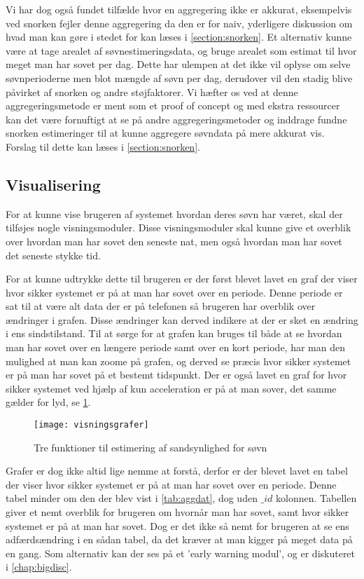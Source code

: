 Vi har dog også fundet tilfælde hvor en aggregering ikke er akkurat, eksempelvis ved snorken fejler denne aggregering da den er for naiv, yderligere diskussion om hvad man kan gøre i stedet for kan læses i \cref{section:snorken}.
Et alternativ kunne være at tage arealet af søvnestimeringsdata, og bruge arealet som estimat til hvor meget man har sovet per dag.
Dette har ulempen at det ikke vil oplyse om selve søvnperioderne men blot mængde af søvn per dag, derudover vil den stadig blive påvirket af snorken og andre støjfaktorer.
Vi hæfter os ved at denne aggregeringsmetode er ment som et proof of concept og med ekstra ressourcer kan det være fornuftigt at se på andre aggregeringsmetoder og inddrage fundne snorken estimeringer til at kunne aggregere søvndata på mere akkurat vis. Forslag til dette kan læses i \cref{section:snorken}.

\subsection{Visualisering}\label{sec:pocVis}
For at kunne vise brugeren af systemet hvordan deres søvn har været, skal der tilføjes nogle visningsmoduler.
Disse visningsmoduler skal kunne give et overblik over hvordan man har sovet den seneste nat, men også hvordan man har sovet det seneste stykke tid.

For at kunne udtrykke dette til brugeren er der først blevet lavet en graf der viser hvor sikker systemet er på at man har sovet over en periode.
Denne periode er sat til at være alt data der er på telefonen så brugeren har overblik over ændringer i grafen.
Disse ændringer kan derved indikere at der er sket en ændring i ens sindstilstand.
Til at sørge for at grafen kan bruges til både at se hvordan man har sovet over en længere periode samt over en kort periode, har man den mulighed at man kan zoome på grafen, og derved se præcis hvor sikker systemet er på man har sovet på et bestemt tidspunkt.
Der er også lavet en graf for hvor sikker systemet ved hjælp af kun acceleration er på at man sover, det samme gælder for lyd, se \cref{fig:visningsgrafer}.

\begin{figure}[h]
	\centering
	\texttt{[image: visningsgrafer]}
	\caption{Tre funktioner til estimering af sandsynlighed for søvn}\label{fig:visningsgrafer}
\end{figure}

Grafer er dog ikke altid lige nemme at forstå, derfor er der blevet lavet en tabel der viser hvor sikker systemet er på at man har sovet over en periode.
Denne tabel minder om den der blev vist i \cref{tab:aggdat}, dog uden $\_id$ kolonnen.
Tabellen giver et nemt overblik for brugeren om hvornår man har sovet, samt hvor sikker systemet er på at man har sovet.
Dog er det ikke så nemt for brugeren at se ens adfærdsændring i en sådan tabel, da det kræver at man kigger på meget data på en gang.
Som alternativ kan der ses på et 'early warning modul', og er diskuteret i \cref{chap:bigdisc}.
